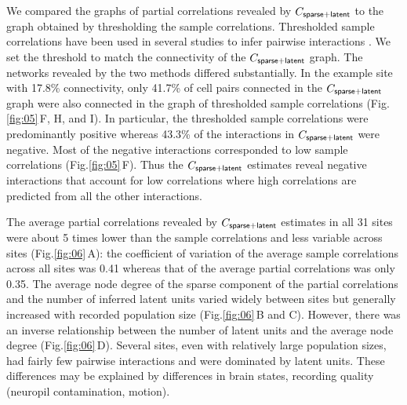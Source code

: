 \documentclass[10pt]{article}
\newcommand{\figref}[2]{Fig.\;\ref{fig:#1}\,#2}
\begin{document}
We compared the graphs of partial correlations revealed by $C_{\sf sparse+latent}$ to the graph obtained by thresholding the sample correlations.   Thresholded sample correlations have been used in several studies to infer pairwise interactions \cite{Golshani:2009, Feldt:2011, Malmersjo:2013}.  We set the threshold to match the connectivity of the $C_{\sf sparse+latent}$ graph.  The networks revealed by the two methods differed substantially. In the example site with 17.8\% connectivity, only 41.7\% of cell pairs connected in the $C_{\sf sparse+latent}$ graph were also connected in the graph of thresholded sample correlations (\figref{05}{F, H, and I}).   In particular, the thresholded sample correlations were predominantly positive whereas 43.3\% of the interactions in $C_{\sf sparse+latent}$ were negative.  Most of the negative interactions corresponded to low sample correlations (\figref{05}{F}).  Thus the $C_{\sf sparse+latent}$ estimates reveal negative interactions that account for low correlations where high correlations are predicted from all the other interactions. 

The average partial correlations revealed by $C_{\sf sparse+latent}$ estimates in all 31 sites were about 5 times lower than the sample correlations and less variable across sites (\figref{06}{A}): the coefficient of variation of the average sample correlations across all sites was 0.41 whereas that of the average partial correlations was only 0.35.  The average node degree of the sparse component of the partial correlations and the number of inferred latent units varied widely between sites but generally increased with recorded population size (\figref{06}{B and C}). However, there was an inverse relationship between the number of latent units and the average node degree (\figref{06}{D}). Several sites, even with relatively large population sizes, had fairly few pairwise interactions and were dominated by latent units.  These differences may be explained by differences in brain states, recording quality (neuropil contamination, motion).
\end{document}
